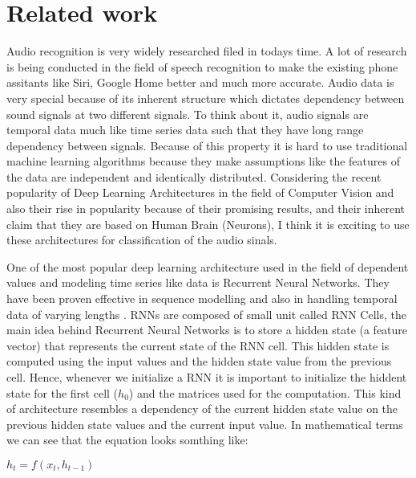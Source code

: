 \documentclass[11pt]{article}
\begin{document}
\section{Related work}
\label{sec:rw}
Audio recognition is very widely researched filed in todays time. A lot of research is being conducted in the field of speech recognition to make the existing phone assitants like Siri, Google Home better and much more accurate. Audio data is very special because of its inherent structure which dictates dependency between sound signals at two different signals. To think about it, audio signals are temporal data much like time series data such that they have long range dependency between signals. Because of this property it is hard to use traditional machine learning algorithms because they make assumptions like the features of the data are independent and identically distributed. Considering the recent popularity of Deep Learning Architectures in the field of Computer Vision and also their rise in popularity because of their promising results, and their inherent claim that they are based on Human Brain (Neurons), I think it is exciting to use these architectures for classification of the audio sinals.

One of the most popular deep learning architecture used in the field of dependent values and modeling time series like data is Recurrent Neural Networks. They have been proven effective in sequence modelling \cite{chung2014empirical} and also in handling temporal data of varying lengths \cite{chung2014empirical}. RNNs are composed of small unit called RNN Cells, the main idea behind Recurrent Neural Networks is to store a hidden state (a feature vector) that represents the current state of the RNN cell. This hidden state is computed using the input values and the hidden state value from the previous cell. Hence, whenever we initialize a RNN it is important to initialize the hiddent state for the first cell ($h_0$) and the matrices used for the computation. This kind of architecture resembles a dependency of the current hidden state value on the previous hidden state values and the current input value. In mathematical terms we can see that the equation looks somthing like:


\begin{center}
$h_t = f(x_t, h_{t-1})$
\end{center}
\end{document}
